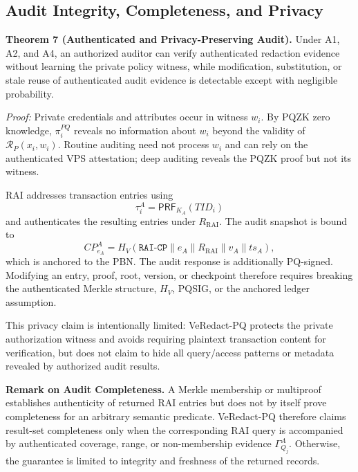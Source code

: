 \documentclass[lettersize,journal]{IEEEtran}
\begin{document}
\subsection{Audit Integrity, Completeness, and Privacy}

\textbf{Theorem 7 (Authenticated and Privacy-Preserving Audit).}
Under A1, A2, and A4, an authorized auditor can verify authenticated
redaction evidence without learning the private policy witness, while
modification, substitution, or stale reuse of authenticated audit
evidence is detectable except with negligible probability.

\emph{Proof:}
Private credentials and attributes occur in witness $w_i$. By PQZK
zero knowledge, $\pi_i^{PQ}$ reveals no information about $w_i$ beyond
the validity of $\mathcal{R}_P(x_i,w_i)$. Routine auditing need not
process $w_i$ and can rely on the authenticated VPS attestation;
deep auditing reveals the PQZK proof but not its witness.

RAI addresses transaction entries using
\begin{equation}
\tau_i^A=\mathsf{PRF}_{K_A}(TID_i)
\end{equation}
and authenticates the resulting entries under
$R_{\mathrm{RAI}}$. The audit snapshot is bound to
\begin{equation}
CP_{e_A}^{A}
=
H_V(\texttt{RAI-CP}\parallel e_A
\parallel R_{\mathrm{RAI}}\parallel v_A\parallel ts_A),
\end{equation}
which is anchored to the PBN. The audit response is additionally
PQ-signed. Modifying an entry, proof, root, version, or checkpoint
therefore requires breaking the authenticated Merkle structure,
$H_V$, PQSIG, or the anchored ledger assumption.

This privacy claim is intentionally limited: VeRedact-PQ protects the
private authorization witness and avoids requiring plaintext
transaction content for verification, but does not claim to hide all
query/access patterns or metadata revealed by authorized audit results.

\medskip
\noindent\textbf{Remark on Audit Completeness.}
A Merkle membership or multiproof establishes authenticity of returned
RAI entries but does not by itself prove completeness for an arbitrary
semantic predicate. VeRedact-PQ therefore claims result-set
completeness only when the corresponding RAI query is accompanied by
authenticated coverage, range, or non-membership evidence
$\Gamma_{Q_j}^{A}$. Otherwise, the guarantee is limited to integrity
and freshness of the returned records.
\end{document}
